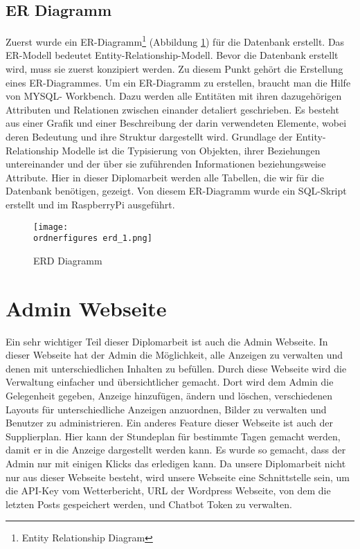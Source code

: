 \subsection{ER Diagramm}
Zuerst wurde ein ER-Diagramm\footnote{Entity Relationship Diagram} (Abbildung \ref{fi:erd}) für die Datenbank erstellt. Das ER-Modell bedeutet Entity-Relationship-Modell. Bevor die Datenbank erstellt wird, muss sie zuerst konzipiert werden. Zu diesem Punkt gehört die Erstellung eines ER-Diagrammes. Um ein ER-Diagramm zu erstellen, braucht man die Hilfe von MYSQL- Workbench. Dazu werden alle Entitäten mit ihren dazugehörigen Attributen und Relationen zwischen einander detaliert geschrieben. Es besteht aus einer Grafik und einer Beschreibung der darin verwendeten Elemente, wobei deren Bedeutung und ihre Struktur dargestellt wird. Grundlage der Entity-Relationship Modelle ist die Typisierung von Objekten, ihrer Beziehungen untereinander und der über sie zuführenden Informationen beziehungsweise Attribute. Hier in dieser Diplomarbeit werden alle Tabellen, die wir für die Datenbank benötigen, gezeigt. Von diesem ER-Diagramm wurde ein SQL-Skript erstellt und im RaspberryPi ausgeführt.

\begin{figure}[H]
	\centering
	\texttt{[image: \\ordnerfigures erd\_1.png]}
	\caption{ERD Diagramm}
	\label{fi:erd}
\end{figure}

\section{Admin Webseite}
Ein sehr wichtiger Teil dieser Diplomarbeit ist auch die Admin Webseite. In dieser Webseite hat der Admin die M\"{o}glichkeit, alle Anzeigen zu verwalten und denen mit unterschiedlichen Inhalten zu bef\"{u}llen. Durch diese Webseite wird die Verwaltung einfacher und \"{u}bersichtlicher gemacht. Dort wird dem Admin die Gelegenheit gegeben, Anzeige hinzuf\"{u}gen, \"{a}ndern und l\"{o}schen, verschiedenen Layouts f\"{u}r unterschiedliche Anzeigen anzuordnen, Bilder zu verwalten und Benutzer zu administrieren. Ein anderes Feature dieser Webseite ist auch der Supplierplan. Hier kann der Stundeplan f\"{u}r bestimmte Tagen gemacht werden, damit er in die Anzeige dargestellt werden kann. Es wurde so gemacht, dass der Admin nur mit einigen Klicks das erledigen kann. Da unsere Diplomarbeit nicht nur aus dieser Webseite besteht, wird unsere Webseite eine Schnittstelle sein, um die API-Key vom Wetterbericht, URL der Wordpress Webseite, von dem die letzten Posts gespeichert werden, und Chatbot Token zu verwalten.

